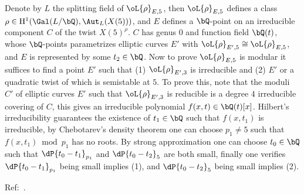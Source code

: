 \documentclass[article, a4paper, twoside]{universal}
\begin{document}
\begin{prf}
	Denote by $L$ the splitting field of $\oL{\rho}_{E,5}$, then $\oL{\rho}_{E,5}$ defines a class $\rho\in \mathrm{H}_{}^{1}(\Gal(L/\bQ),\Aut_{L}(X(5)))$, and $E$ defines a $\bQ$-point on an irreducible component $C$ of the twist $X(5)^{\rho}$. $C$ has genus $0$ and function field $\bQ(t)$, whose $\bQ$-points parametrizes elliptic curves $E'$ with $\oL{\rho}_{E',5}\cong\oL{\rho}_{E,5}$, and $E$ is represented by some $t_{2}\in\bQ$. Now to prove $\oL{\rho}_{E,5}$ is modular it suffices to find a point $E'$ such that (1) $\oL{\rho}_{E',3}$ is irreducible and (2) $E'$ or a quadratic twist of which is semistable at $5$. To prove this, note that the moduli $C'$ of elliptic curves $E'$ such that $\oL{\rho}_{E',3}$ is reducible is a degree $4$ irreducible covering of $C$, this gives an irreducible polynomial $f(x,t)\in\bQ(t)[x]$. Hilbert's irreducibility guarantees the existence of $t_{1}\in\bQ$ such that $f(x,t_{1})$ is irreducible, by Chebotarev's density theorem one can choose $p_{1}\neq5$ such that $f(x,t_{1})\bmod{p_{1}}$ has no roots. By strong approximation one can choose $t_{0}\in\bQ$ such that $\dP{t_{0}-t_{1}}_{p_{1}}$ and $\dP{t_{0}-t_{2}}_{5}$ are both small, finally one verifies $\dP{t_{0}-t_{1}}_{p_{1}}$ being small implies (1), and $\dP{t_{0}-t_{2}}_{5}$ being small implies (2).
\end{prf}




Ref:~\cite{GZ1986}.

\end{document}
